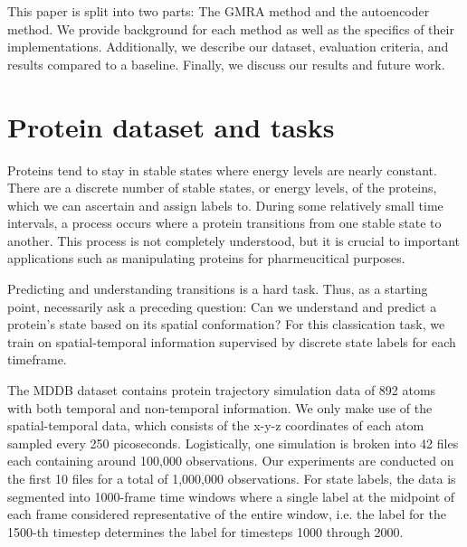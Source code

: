 \documentclass{article}
\begin{document}
This paper is split into two parts: The GMRA method and the autoencoder method. We provide background for each method as well as the specifics of their implementations. Additionally, we describe our dataset, evaluation criteria, and results compared to a baseline. Finally, we discuss our results and future work.

\section{Protein dataset and tasks}
{\color{red}{TODO: explain the dataset, state prediction task, state transition task, motivate why we want to automatically learn representations i.e. right now most representations used to solve these tasks are hand-crafted by for example removing some heavy molecules or considering only certain residues. Explain the format of the dataset we are working with as well}}

Proteins tend to stay in stable states where energy levels are nearly constant. There are a discrete number of stable states, or energy levels, of the proteins, which we can ascertain and assign labels to. During some relatively small time intervals, a process occurs where a protein transitions from one stable state to another. This process is not completely understood, but it is crucial to important applications such as manipulating proteins for pharmeucitical purposes.

Predicting and understanding transitions is a hard task. Thus, as a starting point, necessarily ask a preceding question: Can we understand and predict a protein’s state based on its spatial conformation? For this classication task, we train on spatial-temporal information supervised by discrete state labels for each timeframe.

The MDDB dataset contains protein trajectory simulation data of 892 atoms with both temporal and non-temporal information. We only make use of the spatial-temporal data, which consists of the x-y-z coordinates of each atom sampled every 250 picoseconds. Logistically, one simulation is broken into 42 files each containing around 100,000 observations. Our experiments are conducted on the first 10 files for a total of 1,000,000 observations. For state labels, the data is segmented into 1000-frame time windows where a single label at the midpoint of each frame considered representative of the entire window, i.e. the label for the 1500-th timestep determines the label for timesteps 1000 through 2000.
\end{document}
